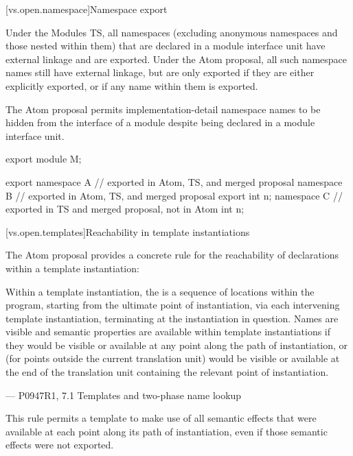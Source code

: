 [vs.open.namespace]{Namespace export}

\pnum
Under the Modules TS,
all namespaces
(excluding anonymous namespaces and those nested within them)
that are declared in a module interface unit
have external linkage and
are exported.
Under the Atom proposal,
all such namespace names
still have external linkage,
but are only exported if they are either
explicitly exported, or
if any name within them is exported.
\begin{note}
The Atom proposal permits implementation-detail namespace names
to be hidden from the interface of a module
despite being declared in a module interface unit.
\end{note}

\pnum
\begin{example}
\begin{codeblock}
export module M;

export namespace A {} // exported in Atom, TS, and merged proposal
namespace B {         // exported in Atom, TS, and merged proposal
  export int n;
}
namespace C {         // exported in TS and merged proposal, not in Atom
  int n;
}
\end{codeblock}
\end{example}

[vs.open.templates]{Reachability in template instantiations}

\pnum
The Atom proposal provides a concrete rule for
the reachability of declarations
within a template instantiation:

\hfill\begin{minipage}{\dimexpr\textwidth-1cm}
Within a template instantiation, the 
is a sequence of locations within the program,
starting from the ultimate point of instantiation,
via each intervening template instantiation,
terminating at the instantiation in question.
Names are visible and semantic properties are available
within template instantiations
if they would be visible or available
at any point along the path of instantiation,
or (for points outside the current translation unit)
would be visible or available
at the end of the translation unit
containing the relevant point of instantiation.
\begin{flushright}
--- P0947R1, 7.1 Templates and two-phase name lookup
\end{flushright}
\end{minipage}

This rule permits a template to make use of all semantic effects
that were available at each point along its path of instantiation,
even if those semantic effects were not exported.

